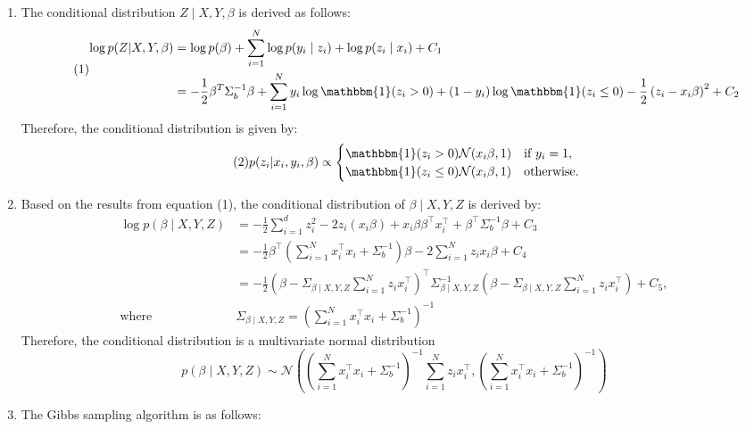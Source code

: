 \documentclass[
]{article}
\begin{document}
\begin{enumerate}
\def\labelenumi{\arabic{enumi}.}
\item
  The conditional distribution \(Z\mid X, Y,\beta\) is derived as
  follows: \[
  \tag{1}
  \begin{aligned}
    \log{p}(Z|X,Y,\beta) &= \log{p}(\beta) + \sum\limits_{i=1}^{N}\log{p}(y_{i}\mid z_{i}) + \log{p}(z_{i}\mid x_{i}) + C_{1} \\
    &= -\frac{1}{2}\beta^{T}\Sigma_{b}^{-1}\beta + \sum\limits_{i=1}^{N}y_{i}\log\mathbbm{1}(z_{i}>0) + (1-y_{i})\log\mathbbm{1}(z_{i}\leq 0) - \frac{1}{2}\left(z_{i}-x_{i}\beta\right)^{2} + C_{2}
  \end{aligned}
  \] Therefore, the conditional distribution is given by: \[
  \tag{2}
  p(z_{i}|x_{i},y_{i},\beta)\propto\begin{cases}
    \mathbbm{1}(z_{i}>0)\mathcal{N}(x_{i}\beta,1) & \text{if } y_{i}=1, \\
    \mathbbm{1}(z_{i}\leq 0)\mathcal{N}(x_{i}\beta,1) & \text{otherwise.}
  \end{cases}
  \]
\item
  Based on the results from equation (1), the conditional distribution
  of \(\beta\mid X,Y,Z\) is derived by: \[
  \begin{aligned}
  \log{p}(\beta\mid X,Y,Z) &= -\frac{1}{2}\sum\limits_{i=1}^{d}z_{i}^{2}-2z_{i}(x_{i}\beta) + x_{i}\beta\beta^{\intercal}x_{i}^{\intercal} + \beta^{\intercal}\Sigma_{b}^{-1}\beta + C_{3} \\
  &= -\frac{1}{2}\beta^{\intercal}\left(\sum\limits_{i=1}^{N}x_{i}^{\intercal}x_{i}+\Sigma_{b}^{-1}\right)\beta - 2\sum\limits_{i=1}^{N}z_{i}x_{i}\beta + C_{4} \\
  &= -\frac{1}{2}\left(\beta-\Sigma_{\beta\mid X,Y,Z}\sum\limits_{i=1}^{N}z_{i}x_{i}^{\intercal}\right)^{\intercal}\Sigma_{\beta\mid X,Y,Z}^{-1}\left(\beta-\Sigma_{\beta\mid X,Y,Z}\sum\limits_{i=1}^{N}z_{i}x_{i}^{\intercal}\right) + C_{5}, \\
  \text{where}\quad & \Sigma_{\beta\mid X,Y,Z} = \left(\sum\limits_{i=1}^{N}x_{i}^{\intercal}x_{i}+\Sigma_{b}^{-1}\right)^{-1}
  \end{aligned}
  \] Therefore, the conditional distribution is a multivariate normal
  distribution \[
  \tag{2}
  p(\beta\mid X,Y,Z)\sim\mathcal{N}\left(\left(\sum\limits_{i=1}^{N}x_{i}^{\intercal}x_{i}+\Sigma_{b}^{-1}\right)^{-1}\sum\limits_{i=1}^{N}z_{i}x_{i}^{\intercal}, \left(\sum\limits_{i=1}^{N}x_{i}^{\intercal}x_{i}+\Sigma_{b}^{-1}\right)^{-1}\right)
  \]
\item
  The Gibbs sampling algorithm is as follows:
\end{enumerate}
\end{document}
